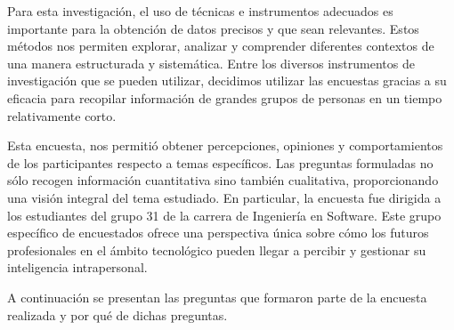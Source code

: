 Para esta investigación, el uso de técnicas e instrumentos adecuados es importante para la obtención de datos precisos y que sean relevantes. Estos métodos nos permiten explorar, analizar y comprender diferentes contextos de una manera estructurada y sistemática. Entre los diversos instrumentos de investigación que se pueden utilizar, decidimos utilizar las encuestas gracias a su eficacia para recopilar información de grandes grupos de personas en un tiempo relativamente corto. 

Esta encuesta, nos permitió obtener percepciones, opiniones y comportamientos de los participantes respecto a temas específicos. Las preguntas formuladas no sólo recogen información cuantitativa sino también cualitativa, proporcionando una visión integral del tema estudiado. En particular, la encuesta fue dirigida a los estudiantes del grupo 31 de la carrera de Ingeniería en Software. Este grupo específico de encuestados ofrece una perspectiva única sobre cómo los futuros profesionales en el ámbito tecnológico pueden llegar a percibir y gestionar su inteligencia intrapersonal. 

A continuación se presentan las preguntas que formaron parte de la encuesta realizada y por qué de dichas preguntas.

